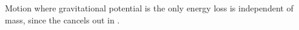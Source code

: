 \begin{problem}[A1987PIQ5a]
{{ Motion where gravitational potential is the only energy loss is independent of mass, since the  cancels out in .
}}
\end{problem}